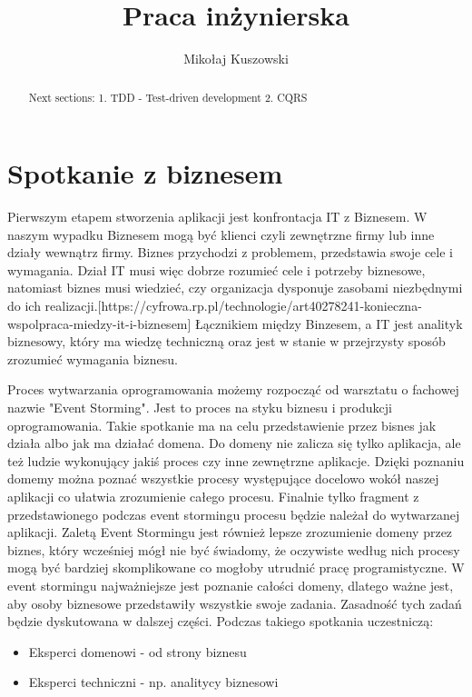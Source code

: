 \documentclass{article}
\title{Praca inżynierska}
\author{Mikołaj Kuszowski}
\begin{document}
\maketitle

\begin{abstract}
      Next sections: 1. TDD - Test-driven development  2. CQRS
\end{abstract}

\section{Spotkanie z biznesem}
      Pierwszym etapem stworzenia aplikacji jest konfrontacja IT z Biznesem. W naszym wypadku Biznesem mogą być klienci czyli zewnętrzne firmy lub inne działy wewnątrz firmy. Biznes przychodzi z problemem, przedstawia swoje cele i wymagania. Dział IT musi więc dobrze rozumieć cele i potrzeby biznesowe, natomiast biznes musi wiedzieć, czy organizacja dysponuje zasobami niezbędnymi do ich realizacji.[https://cyfrowa.rp.pl/technologie/art40278241-konieczna-wspolpraca-miedzy-it-i-biznesem] Łącznikiem między Binzesem, a IT jest analityk biznesowy, który ma wiedzę techniczną oraz jest w stanie w przejrzysty sposób zrozumieć wymagania biznesu.

      Proces wytwarzania oprogramowania możemy rozpocząć od warsztatu o fachowej nazwie "Event Storming". Jest to proces na styku biznesu i produkcji oprogramowania. Takie spotkanie ma na celu przedstawienie przez bisnes jak działa albo jak ma działać domena. Do domeny nie zalicza się tylko aplikacja, ale też ludzie wykonujący jakiś proces czy inne zewnętrzne aplikacje. Dzięki poznaniu domemy można poznać wszystkie procesy występujące docelowo wokół naszej aplikacji co ułatwia zrozumienie całego procesu. Finalnie tylko fragment z przedstawionego podczas event stormingu procesu będzie należał do wytwarzanej aplikacji. Zaletą Event Stormingu jest również lepsze zrozumienie domeny przez biznes, który wcześniej mógł nie być świadomy, że oczywiste według nich procesy mogą być bardziej skomplikowane co mogłoby utrudnić pracę programistyczne. W event stormingu najważniejsze jest poznanie całości domeny, dlatego ważne jest, aby osoby biznesowe przedstawiły wszystkie swoje zadania. Zasadność tych zadań będzie dyskutowana w dalszej części. Podczas takiego spotkania uczestniczą:
      \begin{itemize}
            \item Eksperci domenowi - od strony biznesu
            \item Eksperci techniczni - np. analitycy biznesowi
      \end{itemize}
\end{document}
